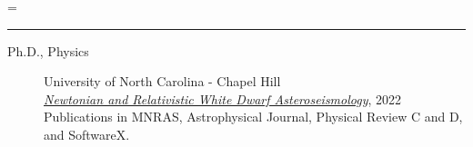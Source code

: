 \documentclass[11pt]{article}
\begin{document}
\begin{list}{}{
  \leftmargin=5pt
  \itemindent=\leftmargin
}
\end{list}

\vspace{0.5\baselineskip}
\hrule
\vspace{-0.5\baselineskip}
\begin{description}
\item[Ph.D., Physics] University of North Carolina - Chapel Hill \hfill \drawplanet\\
 \href{https://cdr.lib.unc.edu/concern/dissertations/jw827n44n?locale=en}{\emph{Newtonian and Relativistic White Dwarf Asteroseismology}}, 2022\\
 Publications in MNRAS, Astrophysical Journal, Physical Review C and D, and SoftwareX.
\end{description}
\end{document}
